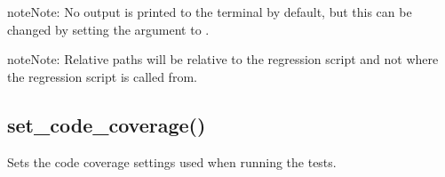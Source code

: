 \documentclass[letterpaper,10pt,english]{sphinxmanual}
\begin{document}
\begin{sphinxadmonition}{note}{Note:}
\sphinxAtStartPar
No output is printed to the terminal by default, but this can
be changed by setting the  argument to .
\end{sphinxadmonition}

\sphinxAtStartPar
{}

\begin{sphinxVerbatim}[commandchars=\\\{\}]

 
\end{sphinxVerbatim}

\begin{sphinxadmonition}{note}{Note:}
\sphinxAtStartPar
Relative paths will be relative to the regression script
and not where the regression script is called from.
\end{sphinxadmonition}


\subsection{set\_code\_coverage()}
\label{\detokenize{api:set-code-coverage}}
\sphinxAtStartPar
Sets the code coverage settings used when running the tests.

\begin{sphinxVerbatim}[commandchars=\\\{\}]
   
\end{sphinxVerbatim}
\end{document}
